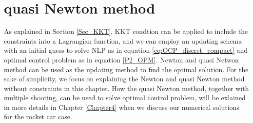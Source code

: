 \documentclass  [
  paper    = a4,
  BCOR     = 10mm,
  twoside,
  fontsize = 12pt,
  fleqn,
  toc      = bibnumbered,
  toc      = listofnumbered,
  numbers  = noendperiod,
  headings = normal,
  listof   = leveldown,
  version  = 3.03
]                                       {scrreprt}
\newcommand{\<}{\langle}
\renewcommand{\>}{\rangle}
\begin{document}

\section{quasi Newton method}

As explained in Section \ref{Sec_KKT}, KKT condtion can be applied to include the constraints into a Lagrangian function, and we can employ an updating schema with an initial guess to solve NLP as in equation \ref{eq:OCP_discret_compact} and optimal control problem as in equation \ref{P2_OPM}. Newton and quasi Netwon method can be used as the updating method to find the optimal solution. 
For the sake of simplicity, we focus on explaining the Newton and quasi Newton method without constraints in this chapter. How the quasi Newton method, together with multiple shooting, can be used to solve optimal control problem, will be exlained in more details in Chapter \ref{Chapter4} when we discuss our numerical solutions for the rocket car case. 


\end{document}
